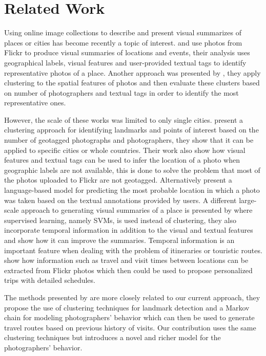 \chapter{Related Work}
\label{sec:related_work}

Using online image collections to describe and present visual summarizes of places or cities has become recently a topic of interest. \citet{Kennedy2007} and \citet{Kennedy2008} use photos from Flickr to produce visual summaries of locations and events, their analysis uses geographical labels, visual features and user-provided textual tags to identify representative photos of a place. Another approach was presented by \cite{Jaffe2006}, they apply clustering to the spatial features of photos and then evaluate these clusters based on number of photographers and textual tags in order to identify the most representative ones.

However, the scale of these works was limited to only single cities. \cite{Kleinberg2009} present a clustering approach for identifying landmarks and points of interest based on the number of geotagged photographs and photographers, they show that it can be applied to specific cities or whole countries. Their work also show how visual features and textual tags can be used to infer the location of a photo when geographic labels are not available, this is done to solve the problem that most of the photos uploaded to Flickr are not geotagged. Alternatively \citet{Serdyukov2009} present a language-based model for predicting the most probable location in which a photo was taken based on the textual annotations provided by users. A different large-scale approach to generating visual summaries of a place is presented by \citet{Li2009} where supervised learning, namely SVMs, is used instead of clustering, they also incorporate temporal information in addition to the visual and textual features and show how it can improve the summaries. Temporal information is an important feature when dealing with the problem of itineraries or touristic routes. \citet{Popescu2009} show how information such as travel and visit times between locations can be extracted from Flickr photos which then could be used to propose personalized trips with detailed schedules.

The methods presented by \cite{Kurashima2010} are more closely related to our current approach, they propose the use of clustering techniques for landmark detection and a Markov chain for modeling photographers' behavior which can then be used to generate travel routes based on previous history of visits. Our contribution uses the same clustering techniques but introduces a novel and richer model for the photographers' behavior.

